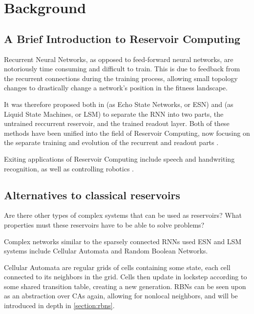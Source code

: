 \section{Background}

\subsection{A Brief Introduction to Reservoir Computing}

Recurrent Neural Networks, as opposed to feed-forward neural networks,
are notoriously time consuming and difficult to train.
This is due to feedback from the recurrent connections during the training process,
allowing small topology changes to drastically change a network's position in the fitness landscape.

It was therefore proposed both in \cite{jaeger2002adaptive} (as Echo State Networks, or ESN)
and \cite{natschlager2002liquid} (as Liquid State Machines, or LSM) to separate the RNN into two parts,
the untrained reccurrent reservoir, and the trained readout layer.
Both of these methods have been unified into the field of Reservoir Computing,
now focusing on the separate training and evolution of the recurrent and readout parts \cite{lukovsevivcius2012reservoir}.

Exiting applications of Reservoir Computing include speech and handwriting recognition,
as well as controlling robotics \cite{lukovsevivcius2012reservoir}.

\subsection{Alternatives to classical reservoirs}

Are there other types of complex systems that can be used as reservoirs?
What properties must these reservoirs have to be able to solve problems?

Complex networks similar to the sparsely connected RNNs used  ESN and LSM systems include Cellular Automata and Random Boolean Networks.

Cellular Automata are regular grids of cells containing some state,
each cell connected to its neighbors in the grid.
Cells then update in lockstep according to some shared transition table,
creating a new generation.
RBNs can be seen upon as an abstraction over CAs again,
allowing for nonlocal neighbors, and will be introduced in depth in \ref{section:rbns}.

